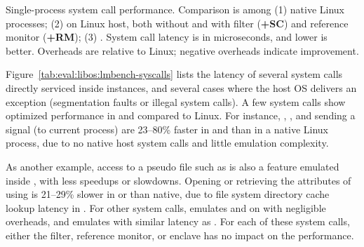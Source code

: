 \label{sec:eval:libos:syscalls}


\begin{table}[t!b!]

\caption{Single-process system call performance. Comparison is among (1) native Linux processes; (2) \graphene{} on Linux host, both without and with \seccomp{} filter ({\bf +SC}) and reference monitor ({\bf +RM}); (3) \graphenesgx{}.
System call latency is in microseconds, and lower is better.
Overheads are relative to Linux; negative overheads indicate improvement.} 
\label{tab:eval:libos:lmbench-syscalls}
\end{table}


Figure~\ref{tab:eval:libos:lmbench-syscalls}
lists the latency of several system calls directly serviced inside \thelibos{} instances,
and several cases where the host OS delivers an exception
(segmentation faults or illegal system calls).
A few system calls show optimized performance
in \graphene{} and \graphenesgx{} compared to Linux.
For instance,
, , and sending a  signal (to current process)
are 23--80\% faster in \graphene{} and \graphenesgx{} than in a native Linux process,
due to no native host system calls and little emulation complexity.



As another example, access to a pseudo file
such as 
is also a feature emulated
inside \thelibos{},
with less speedups or slowdowns.
Opening 
or retrieving the attributes of  using 
is 21--29\% slower in \graphene{} or \graphenesgx{} than native,
due to file system directory cache lookup latency
in \thelibos{}.
For other system calls, \thelibos{} emulates  and 
on 
with negligible overheads,
and emulates  with
similar latency as .
For each of these system calls, either the \seccomp{} filter, reference monitor, or enclave
has no impact on the performance.


